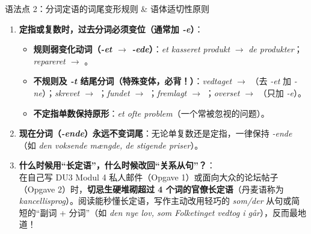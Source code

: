 \begin{grammatikbox}{语法点 2：分词定语的词尾变形规则 \& 语体适切性原则}
\begin{enumerate}
  \item \textbf{定指或复数时，过去分词必须变位（通常加 \textit{-e}）}：
    \begin{itemize}
      \item \textbf{规则弱变化动词（\textit{-et $\rightarrow$ -ede}）}：\textit{et kasseret produkt} $\rightarrow$ \textit{de  produkter}；\textit{repareret $\rightarrow$ }。
      \item \textbf{不规则及 \textit{-t} 结尾分词（特殊变体，必背！）}：\textit{vedtaget $\rightarrow$ }（去 \textit{-et} 加 \textit{-ne}）；\textit{skrevet $\rightarrow$ }；\textit{fundet $\rightarrow$ }；\textit{fremlagt $\rightarrow$ }；\textit{overset $\rightarrow$ }（只加 \textit{-e}）。
      \item \textbf{不定指单数保持原形}：\textit{et ofte  problem}（一个常被忽视的问题）。
    \end{itemize}
  \item \textbf{现在分词（\textit{-ende}）永远不变词尾}：无论单复数还是定指，一律保持 \textit{-ende}（如 \textit{den voksende mængde, de stigende priser}）。
  \item \textbf{什么时候用“长定语”，什么时候改回“关系从句”？}：\\
    在自己写 DU3 Modul 4 私人邮件（Opgave 1）或面向大众的论坛帖子（Opgave 2）时，\textbf{切忌生硬堆砌超过 4 个词的官僚长定语}（丹麦语称为 \textit{kancellisprog}）。阅读能秒懂长定语，写作主动改用轻巧的 \textit{som/der} 从句或简短的“副词 + 分词”（如 \textit{den nye lov, som Folketinget vedtog i går}），反而最地道！
\end{enumerate}
\end{grammatikbox}

